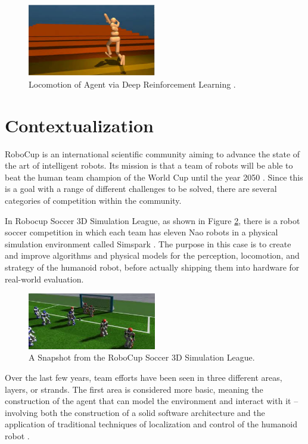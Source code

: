 \begin{figure}[ht!]
\centering
\includegraphics[width=0.5\textwidth]{Cap1/Locomotion}
\caption{Locomotion of Agent via Deep Reinforcement Learning \cite{DBLP:journals/corr/HeessTSLMWTEWER17}.}
\label{locomotion}
\end{figure}


\section{Contextualization}

RoboCup is an international scientific community aiming to advance the state of the art of intelligent robots. Its mission is that a team of robots will be able to beat the human team champion of the World Cup until the year 2050 \cite{10.1007/3-540-64473-3_46}. Since this is a goal with a range of different challenges to be solved, there are several categories of competition within the community.

In Robocup Soccer 3D Simulation League, as shown in Figure \ref{soccer3d}, there is a robot soccer competition in which each team has eleven Nao robots in a physical simulation environment called Simspark \cite{simspark2005}. The purpose in this case is to create and improve algorithms and physical models for the perception, locomotion, and strategy of the humanoid robot, before actually shipping them into hardware for real-world evaluation.

\begin{figure}[ht!]
\centering
\includegraphics[width=0.5\textwidth]{Cap1/Soccer3D}
\caption{A Snapshot from the RoboCup Soccer 3D Simulation League.}
\label{soccer3d}
\end{figure}

Over the last few years, team efforts have been seen in three different areas, layers, or strands. The first area is considered more basic, meaning the construction of the agent that can model the environment and interact with it -- involving both the construction of a solid software architecture and the application of traditional techniques of localization and control of the humanoid robot \cite{AI1110-macalpine}.

